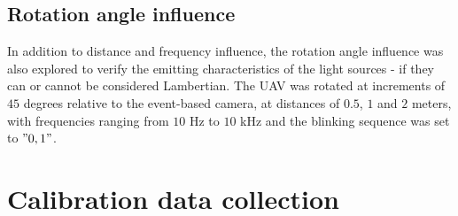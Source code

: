 \subsection{Rotation angle influence}

In addition to distance and frequency influence, the rotation angle influence was also explored to
verify the emitting characteristics of the light sources - if they can or cannot be considered Lambertian.
The \ac{UAV} was rotated at increments of $45$ degrees relative to the event-based camera, at distances of $0.5$, $1$ and $2$ meters,
with frequencies ranging from $10$ Hz to $10$ kHz and the blinking sequence was set to $"0, 1"$.





\section{Calibration data collection}

